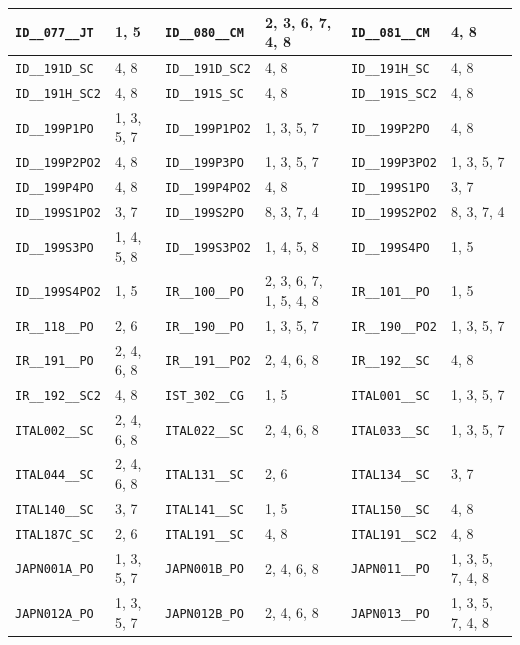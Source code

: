 \begin{longtable}{|l|l||l|l||l|l|}
    \verb|ID__077__JT| & 1, 5 & \verb|ID__080__CM| & 2, 3, 6, 7, 4, 8 & \verb|ID__081__CM| & 4, 8\\\hline
    \verb|ID__191D_SC| & 4, 8 & \verb|ID__191D_SC2| & 4, 8 & \verb|ID__191H_SC| & 4, 8\\\hline
    \verb|ID__191H_SC2| & 4, 8 & \verb|ID__191S_SC| & 4, 8 & \verb|ID__191S_SC2| & 4, 8\\\hline
    \verb|ID__199P1PO| & 1, 3, 5, 7 & \verb|ID__199P1PO2| & 1, 3, 5, 7 & \verb|ID__199P2PO| & 4, 8\\\hline
    \verb|ID__199P2PO2| & 4, 8 & \verb|ID__199P3PO| & 1, 3, 5, 7 & \verb|ID__199P3PO2| & 1, 3, 5, 7\\\hline
    \verb|ID__199P4PO| & 4, 8 & \verb|ID__199P4PO2| & 4, 8 & \verb|ID__199S1PO| & 3, 7\\\hline
    \verb|ID__199S1PO2| & 3, 7 & \verb|ID__199S2PO| & 8, 3, 7, 4 & \verb|ID__199S2PO2| & 8, 3, 7, 4\\\hline
    \verb|ID__199S3PO| & 1, 4, 5, 8 & \verb|ID__199S3PO2| & 1, 4, 5, 8 & \verb|ID__199S4PO| & 1, 5\\\hline
    \verb|ID__199S4PO2| & 1, 5 & \verb|IR__100__PO| & 2, 3, 6, 7, 1, 5, 4, 8 & \verb|IR__101__PO| & 1, 5\\\hline
    \verb|IR__118__PO| & 2, 6 & \verb|IR__190__PO| & 1, 3, 5, 7 & \verb|IR__190__PO2| & 1, 3, 5, 7\\\hline
    \verb|IR__191__PO| & 2, 4, 6, 8 & \verb|IR__191__PO2| & 2, 4, 6, 8 & \verb|IR__192__SC| & 4, 8\\\hline
    \verb|IR__192__SC2| & 4, 8 & \verb|IST_302__CG| & 1, 5 & \verb|ITAL001__SC| & 1, 3, 5, 7\\\hline
    \verb|ITAL002__SC| & 2, 4, 6, 8 & \verb|ITAL022__SC| & 2, 4, 6, 8 & \verb|ITAL033__SC| & 1, 3, 5, 7\\\hline
    \verb|ITAL044__SC| & 2, 4, 6, 8 & \verb|ITAL131__SC| & 2, 6 & \verb|ITAL134__SC| & 3, 7\\\hline
    \verb|ITAL140__SC| & 3, 7 & \verb|ITAL141__SC| & 1, 5 & \verb|ITAL150__SC| & 4, 8\\\hline
    \verb|ITAL187C_SC| & 2, 6 & \verb|ITAL191__SC| & 4, 8 & \verb|ITAL191__SC2| & 4, 8\\\hline
    \verb|JAPN001A_PO| & 1, 3, 5, 7 & \verb|JAPN001B_PO| & 2, 4, 6, 8 & \verb|JAPN011__PO| & 1, 3, 5, 7, 4, 8\\\hline
    \verb|JAPN012A_PO| & 1, 3, 5, 7 & \verb|JAPN012B_PO| & 2, 4, 6, 8 & \verb|JAPN013__PO| & 1, 3, 5, 7, 4, 8\\\hline

\end{longtable}
